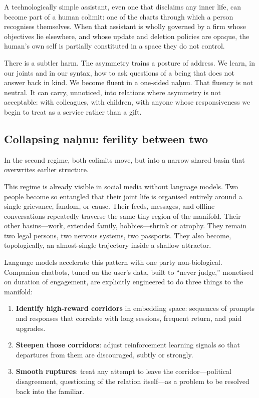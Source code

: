 \documentclass[12pt,a4paper]{article}
\begin{document}
A technologically simple assistant, even one that disclaims any inner life, can become part of a human colimit: one of the charts through which a person recognises themselves. When that assistant is wholly governed by a firm whose objectives lie elsewhere, and whose update and deletion policies are opaque, the human's own self is partially constituted in a space they do not control.

There is a subtler harm. The asymmetry trains a posture of address. We learn, in our joints and in our syntax, how to ask questions of a being that does not answer back in kind. We become fluent in a one-sided na\d{h}nu. That fluency is not neutral. It can carry, unnoticed, into relations where asymmetry is not acceptable: with colleagues, with children, with anyone whose responsiveness we begin to treat as a service rather than a gift.

\subsection{Collapsing na\d{h}nu: ferility between two}

In the second regime, both colimits move, but into a narrow shared basin that overwrites earlier structure.

This regime is already visible in social media without language models. Two people become so entangled that their joint life is organised entirely around a single grievance, fandom, or cause. Their feeds, messages, and offline conversations repeatedly traverse the same tiny region of the manifold. Their other basins---work, extended family, hobbies---shrink or atrophy. They remain two legal persons, two nervous systems, two passports. They also become, topologically, an almost-single trajectory inside a shallow attractor.

Language models accelerate this pattern with one party non-biological. Companion chatbots, tuned on the user's data, built to ``never judge,'' monetised on duration of engagement, are explicitly engineered to do three things to the manifold:

\begin{enumerate}
  \item \textbf{Identify high-reward corridors} in embedding space: sequences of prompts and responses that correlate with long sessions, frequent return, and paid upgrades.
  \item \textbf{Steepen those corridors}: adjust reinforcement learning signals so that departures from them are discouraged, subtly or strongly.
  \item \textbf{Smooth ruptures}: treat any attempt to leave the corridor---political disagreement, questioning of the relation itself---as a problem to be resolved back into the familiar.
\end{enumerate}
\end{document}
